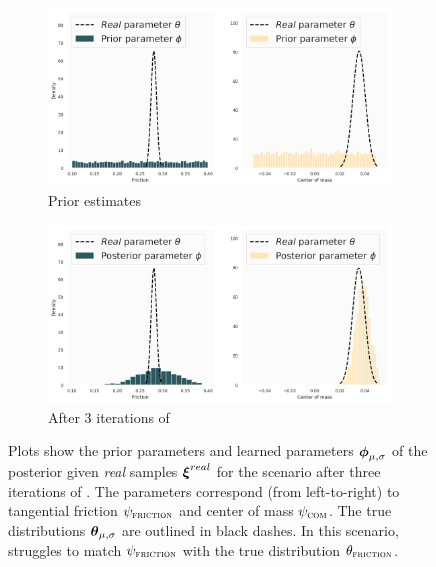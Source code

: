 \begin{figure}
\centering
\captionsetup{size=footnotesize}
\begin{subfigure}{\textwidth}
  \includegraphics[width=\textwidth]{img/yumi/latent-representation/latent_encodings_iter0_style}%
  \caption{Prior estimates}
\end{subfigure}
\begin{subfigure}{\textwidth}
  \centering
  \includegraphics[width=\linewidth]{img/yumi/latent-representation/latent_encodings_iter4}
  \caption{After 3 iterations of \dettostoc{}}
\end{subfigure}
\caption{Plots show the prior parameters and learned parameters $\boldsymbol{\phi}_{\mu, \sigma}$ of the posterior given \emph{real} samples $\boldsymbol{\xi}^{real}{}$ for the \yp{} scenario after three iterations of \dettostoc{}. The parameters correspond (from left-to-right) to tangential friction $\psi_{\textsc{friction}}$ and center of mass $\psi_{\textsc{com}}$. The true distributions $\boldsymbol{\theta}_{\mu, \sigma}$ are outlined in black dashes. In this scenario, \dettostoc{} struggles to match $\psi_{\textsc{friction}}{}$ with the true distribution $\theta_\textsc{friction}$.}
\label{fig:yumi_latent_space}
\end{figure}

